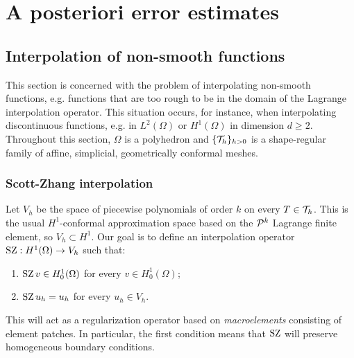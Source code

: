 
\chapter[A posteriori error estimates]{A posteriori error estimates}

\section{Interpolation of non-smooth functions}

This section is concerned with the problem of interpolating non-smooth functions, e.g. functions that are too rough to be in the domain of the Lagrange interpolation operator. This situation occurs, for instance, when interpolating discontinuous functions, e.g. in $L^2(\Omega)$ or $H^1(\Omega)$ in dimension $d \ge 2$.
Throughout this section, $\Omega$ is a polyhedron and $\{\T_h\}_{h>0}$ is a shape-regular family of affine, simplicial, geometrically conformal meshes.

\subsection{Scott-Zhang interpolation}

Let $V_h$ be the space of piecewise polynomials of order $k$ on every $T \in \T_h$. This is the usual $H^1$-conformal approximation space based on the $\P^k$ Lagrange finite element, so $V_h \subset H^1$.
Our goal is to define an interpolation operator $\SZ: H^1(\Omega) \to V_h$ such that:
\begin{enumerate}
    \item $\SZ v \in H^1_0(\Omega)$ for every $v \in H^1_0(\Omega)$;
    \item $\SZ u_h = u_h$ for every $u_h \in V_h$.
\end{enumerate}
This will act as a regularization operator based on \emph{macroelements} consisting of element patches. In particular, the first condition means that $\SZ$ will preserve homogeneous boundary conditions.


